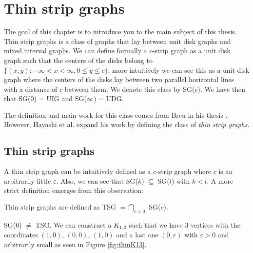 \chapter{Thin strip graphs}
\label{chap:thinDef}

The goal of this chapter is to introduce you to the main subject of this thesis. Thin strip graphs is a class of graphs that lay between unit disk graphs
and mixed interval graphs. We can define formally a $c$-strip graph as a unit disk graph such that the centers of the disks belong to $\{(x,y) : -\infty < x < \infty, 0 \leq y \leq c\}$, more intuitively we can see this as a unit disk graph where the centers of the disks lay between two parallel horizontal lines with a distance of $c$ between them. We denote this class by SG($c$). We
have then that SG($0$) = UIG and SG($\infty$) = UDG.

The definition and main work for this class comes from Breu in his thesis \cite{breuAlgorithmicAspectsConstrained1996}. However, Hayashi et al. \cite{hayashiThinStripGraphs2017} expand his work by defining the class of \emph{thin strip graphs}.

\section{Thin strip graphs}

A thin strip graph can be intuitively defined as a $c$-strip graph where $c$ is an arbitrarily little $\varepsilon$. Also, we can see that SG($k$) $\subseteq$ SG($l$) with $k<l$. A more strict definition emerges from this observation:

\begin{defn}
  Thin strip graphs are defined as TSG $= \bigcap_{c > 0}$ SG($c$).
\end{defn}

\begin{remark}
  SG($0$) $\neq$ TSG. We can construct a $K_{1,3}$ such that we have 3 vertices with the coordinates
  $(1,0)$, $(0,0)$, $(1,0)$ and a last one $(0,\varepsilon)$ with $\varepsilon > 0$ and arbitrarily small
  as seen in Figure \ref{fig:thinK13}.
\end{remark}

